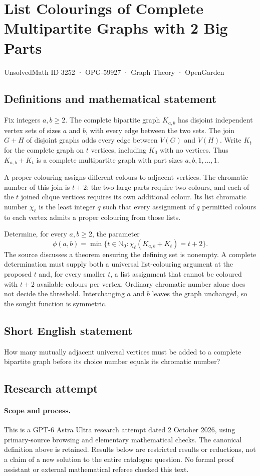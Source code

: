 \documentclass[11pt,a4paper]{article}
\begin{document}
\section*{List Colourings of Complete Multipartite Graphs with 2 Big Parts}\label{3252}
{\small UnsolvedMath ID 3252 · OPG-59927 · Graph Theory · OpenGarden}
\subsection{Definitions and mathematical statement}
Fix integers $a,b\ge2$. The complete bipartite graph $K_{a,b}$ has disjoint
independent vertex sets of sizes $a$ and $b$, with every edge between the
two sets. The join $G+H$ of disjoint graphs adds every edge between
$V(G)$ and $V(H)$. Write $K_t$ for the complete graph on $t$ vertices,
including $K_0$ with no vertices. Thus $K_{a,b}+K_t$ is a complete
multipartite graph with part sizes $a,b,1,\ldots,1$.

A proper colouring assigns different colours to adjacent vertices.
The chromatic number of this join is $t+2$: the two large parts require
two colours, and each of the $t$ joined clique vertices requires its own
additional colour. Its list chromatic number $\chi_\ell$ is the least
integer $q$ such that every assignment of $q$ permitted colours to each
vertex admits a proper colouring from those lists.

Determine, for every $a,b\ge2$, the parameter
\[
 \phi(a,b)=\min\{t\in\mathbb N_0:
                 \chi_\ell(K_{a,b}+K_t)=t+2\}.
\]
The source discusses a theorem ensuring the defining set is nonempty.
A complete determination must supply both a universal list-colouring
argument at the proposed $t$ and, for every smaller $t$, a list assignment
that cannot be coloured with $t+2$ available colours per vertex. Ordinary
chromatic number alone does not decide the threshold. Interchanging $a$
and $b$ leaves the graph unchanged, so the sought function is symmetric.
\subsection{Short English statement}
How many mutually adjacent universal vertices must be added to a complete bipartite graph before its choice number equals its chromatic number?
\subsection{Research attempt}
\paragraph{Scope and process.}
This is a GPT-6 Astra Ultra research attempt dated 2 October 2026, using
primary-source browsing and elementary mathematical checks. The canonical
definition above is retained. Results below are restricted results or
reductions, not a claim of a new solution to the entire catalogue question.
No formal proof assistant or external mathematical referee checked this text.
\end{document}
